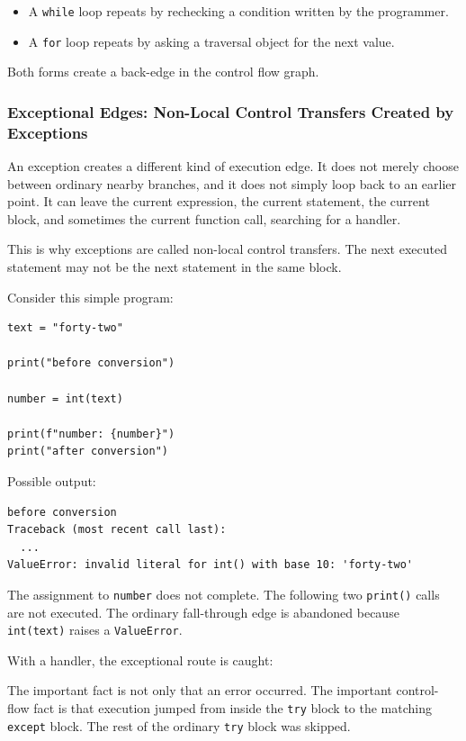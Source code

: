 \begin{itemize}
    \item A \texttt{while} loop repeats by rechecking a condition written by the programmer.
    \item A \texttt{for} loop repeats by asking a traversal object for the next value.
\end{itemize}

Both forms create a back-edge in the control flow graph.

\subsubsection{Exceptional Edges: Non-Local Control Transfers Created by Exceptions}

An exception creates a different kind of execution edge. It does not merely choose between ordinary nearby branches, and it does not simply loop back to an earlier point. It can leave the current expression, the current statement, the current block, and sometimes the current function call, searching for a handler.

This is why exceptions are called non-local control transfers. The next executed statement may not be the next statement in the same block.

Consider this simple program:

\begin{verbatim}
text = "forty-two"

print("before conversion")

number = int(text)

print(f"number: {number}")
print("after conversion")
\end{verbatim}

Possible output:

\begin{verbatim}
before conversion
Traceback (most recent call last):
  ...
ValueError: invalid literal for int() with base 10: 'forty-two'
\end{verbatim}

The assignment to \texttt{number} does not complete. The following two \texttt{print()} calls are not executed. The ordinary fall-through edge is abandoned because \texttt{int(text)} raises a \texttt{ValueError}.

With a handler, the exceptional route is caught:

The important fact is not only that an error occurred. The important control-flow fact is that execution jumped from inside the \texttt{try} block to the matching \texttt{except} block. The rest of the ordinary \texttt{try} block was skipped.

